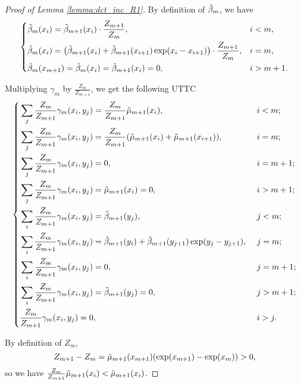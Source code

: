 \documentclass[nohyperref]{article}
\theoremstyle{plain}
\begin{document}
\begin{proof}[Proof of Lemma \ref{lemma:dct_inc_R1}]
By definition of $\Tilde{\beta}_m$, we have
\begin{equation*}
    \left\{
    \begin{aligned}
        &\Tilde{\beta}_m (x_i) = \Tilde{\beta}_{m+1} (x_i) \cdot \frac{Z_{m+1}}{Z_m},& &i < m, \\
        &\Tilde{\beta}_m (x_i) = \left( \Tilde{\beta}_{m+1} (x_i)  + \Tilde{\beta}_{m+1} (x_{i+1}) \exp(x_i - x_{i+1}) \right) \cdot \frac{Z_{m+1}}{Z_m},& &i=m, \\
        &\Tilde{\beta}_m (x_{m+1}) = \Tilde{\beta}_m (x_i) = \Tilde{\beta}_{m+1} (x_i) = 0,& &i>m+1. \\
    \end{aligned}
    \right.
\end{equation*}

Multiplying $\gamma_m$ by $\frac{Z_m}{Z_{m+1}}$, we get the following UTTC
\begin{equation*}
    \left\{
    \begin{aligned}
        &\sum_j \frac{Z_m}{Z_{m+1}} \gamma_m (x_i, y_j) = \frac{Z_m}{Z_{m+1}} \Tilde{\mu}_{m+1} (x_i),& &\ i < m; \\
        &\sum_j \frac{Z_m}{Z_{m+1}} \gamma_m (x_i, y_j) = \frac{Z_m}{Z_{m+1}} (\Tilde{\mu}_{m+1} (x_i) + \Tilde{\mu}_{m+1} (x_{i+1})),& &\ i = m; \\
        &\sum_j \frac{Z_m}{Z_{m+1}} \gamma_m (x_i, y_j) = 0,& &\ i = m+1; \\
        &\sum_j \frac{Z_m}{Z_{m+1}} \gamma_m (x_i, y_j) = \Tilde{\mu}_{m+1} (x_i) = 0,& &\ i > m+1; \\
        &\sum_i \frac{Z_m}{Z_{m+1}} \gamma_m (x_i, y_j) = \Tilde{\beta}_{m+1} (y_j),& &\ j < m; \\
        &\sum_i \frac{Z_m}{Z_{m+1}} \gamma_m (x_i, y_j) = \Tilde{\beta}_{m+1} (y_i)  + \Tilde{\beta}_{m+1} (y_{j+1}) \exp(y_j - y_{j+1}),& &\ j = m; \\
        &\sum_i \frac{Z_m}{Z_{m+1}} \gamma_m (x_i, y_j) = 0,& &\ j = m+1; \\
        &\sum_i \frac{Z_m}{Z_{m+1}} \gamma_m (x_i, y_j) = \Tilde{\beta}_{m+1} (y_j) = 0,& &\ j > m+1; \\
        &\frac{Z_m}{Z_{m+1}} \gamma_m (x_i, y_j) = 0,& &\ i > j. \\
    \end{aligned}
    \right.
\end{equation*}

By definition of $Z_m$,
\begin{equation}
    Z_{m+1} - Z_m = \Tilde{\mu}_{m+1} (x_{m+1}) (\exp(x_{m+1}) - \exp(x_m)) > 0,
\label{eq:Zm_inc}
\end{equation}
so we have $\frac{Z_m}{Z_{m+1}} \Tilde{\mu}_{m+1} (x_i) < \Tilde{\mu}_{m+1} (x_i)$.


\end{proof}
\end{document}
